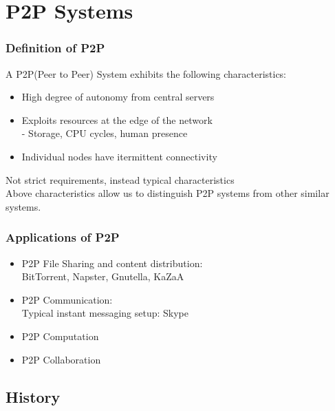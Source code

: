 \section{P2P Systems}

\begin{frame}
    \frametitle{Definition of P2P}
    A P2P(Peer to Peer) System exhibits the following characteristics:
    \begin{itemize}
        \item High degree of \alert{autonomy} from central servers
        \item Exploits resources at the \alert{edge} of the network \\
            - Storage, CPU cycles, human presence
        \item Individual nodes have \alert{itermittent connectivity}
    \end{itemize}
    Not strict requirements, instead \alert{typical characteristics} \\
    Above characteristics allow us to distinguish P2P systems from other similar systems.
\end{frame}

\begin{frame}
    \frametitle{Applications of P2P}
    \begin{itemize}
        \item P2P File Sharing and content distribution: \\
            BitTorrent, Napster, Gnutella, KaZaA
        \item P2P Communication: \\
            Typical instant messaging setup: Skype
        \item P2P Computation \\
        \item P2P Collaboration
    \end{itemize}
\end{frame}

\subsection{History}

